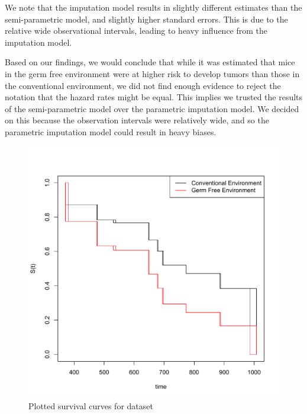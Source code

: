 \documentclass[article]{jss}
\begin{document}
{	We note that the imputation model results in slightly different estimates than the semi-parametric model, and slightly higher standard errors. This is due to the relative wide observational intervals, leading to heavy influence from the imputation model. 
	
	Based on our findings, we would conclude that while it was estimated that mice in the germ free environment were at higher risk to develop tumors than those in the conventional environment, we did not find enough evidence to reject the notation that the hazard rates might be equal. This implies we trusted the results of the semi-parametric model over the parametric imputation model. We decided on this because the observation intervals were relatively wide, and so the parametric imputation model could result in heavy biases. 

\begin{center}
{\begin{figure}
\centering
\includegraphics{mousePlot.pdf}
\caption{Plotted survival curves for  dataset}
\label{plot:tooth}
\end{figure}}
\end{center}	


}
\end{document}
